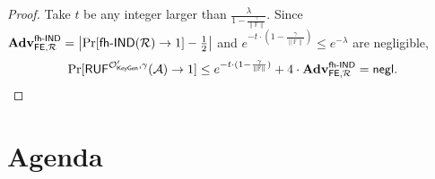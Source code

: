 \begin{proof}
\noindent Take $t$ be any integer larger than $\frac{\lambda}{ 1 - \frac{\gamma}{\| \mathbb{F} \| }}$. Since $\mathbf{Adv}_{\textsf{FE}, \mathcal{R}}^\textsf{fh-IND} = \left| \Pr[\textsf{fh-IND}(\mathcal{R}) \to 1] - \frac{1}{2} \right|$ and $e^{-t \cdot (1 - \frac{\gamma}{\| \mathbb{F} \|}) } \leq e^{-\lambda}$ are negligible,
\[
	\Pr[ \textsf{RUF}^{\mathcal{O}^\prime_{\textsf{KeyGen}}, \gamma}(\mathcal{A}) \to 1]  \leq e^{- t \cdot (1 - \frac{\gamma}{\| \mathbb{F} \|}) } + 4 \cdot \mathbf{Adv}_{\textsf{FE}, \mathcal{R}}^\textsf{fh-IND}  = \mathsf{negl}.
\]

\end{proof}
\newpage


\section{Agenda}

